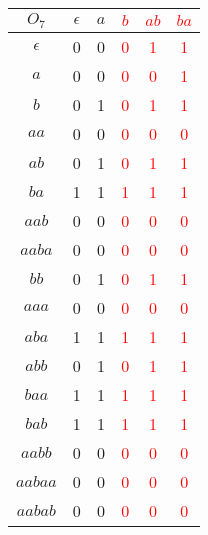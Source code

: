 \begin{minipage}{0.33\linewidth}
	\centering
	\begin{tabular}{|c|ccccc|}
		\hline
		$O_7$ & $\epsilon$ & $a$&\textcolor{red}{$b$}&\textcolor{red}{$ab$}&\textcolor{red}{$ba$}\\
		\hline
		$\epsilon$&0&0&\textcolor{red}{0}&\textcolor{red}{1}&\textcolor{red}{1}\\
		$a$&0&0&\textcolor{red}{0}&\textcolor{red}{0}&\textcolor{red}{1}\\
		$b$&0&1&\textcolor{red}{0}&\textcolor{red}{1}&\textcolor{red}{1}\\
		$aa$&0&0&\textcolor{red}{0}&\textcolor{red}{0}&\textcolor{red}{0}\\
		$ab$&0&1&\textcolor{red}{0}&\textcolor{red}{1}&\textcolor{red}{1}\\
		$ba$&1&1&\textcolor{red}{1}&\textcolor{red}{1}&\textcolor{red}{1}\\
		$aab$&0&0&\textcolor{red}{0}&\textcolor{red}{0}&\textcolor{red}{0}\\
		$aaba$&0&0&\textcolor{red}{0}&\textcolor{red}{0}&\textcolor{red}{0}\\
		\hline
		$bb$&0&1&\textcolor{red}{0}&\textcolor{red}{1}&\textcolor{red}{1}\\
		$aaa$&0&0&\textcolor{red}{0}&\textcolor{red}{0}&\textcolor{red}{0}\\
		$aba$&1&1&\textcolor{red}{1}&\textcolor{red}{1}&\textcolor{red}{1}\\
		$abb$&0&1&\textcolor{red}{0}&\textcolor{red}{1}&\textcolor{red}{1}\\
		$baa$&1&1&\textcolor{red}{1}&\textcolor{red}{1}&\textcolor{red}{1}\\
		$bab$&1&1&\textcolor{red}{1}&\textcolor{red}{1}&\textcolor{red}{1}\\
		$aabb$&0&0&\textcolor{red}{0}&\textcolor{red}{0}&\textcolor{red}{0}\\
		$aabaa$&0&0&\textcolor{red}{0}&\textcolor{red}{0}&\textcolor{red}{0}\\
		$aabab$&0&0&\textcolor{red}{0}&\textcolor{red}{0}&\textcolor{red}{0}\\
		\hline
	\end{tabular}
\end{minipage}

